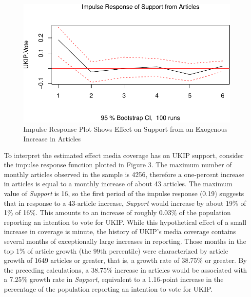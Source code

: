 \documentclass[12pt,]{article}
\makeatletter
\def\maxwidth{\ifdim\Gin@nat@width>\linewidth\linewidth
\else\Gin@nat@width\fi}
\let\Oldincludegraphics\includegraphics
\renewcommand{\includegraphics}[1]{\Oldincludegraphics[width=\maxwidth]{#1}}
\makeatother
\begin{document}
\begin{figure}[htbp]
\centering
\includegraphics{ukip_media_files/figure-latex/unnamed-chunk-8-1.pdf}
\caption{Impulse Response Plot Shows Effect on Support from an Exogenous
Increase in Articles}
\end{figure}

To interpret the estimated effect media coverage has on UKIP support,
consider the impulse response function plotted in Figure 3. The maximum
number of monthly articles observed in the sample is 4256, therefore a
one-percent increase in articles is equal to a monthly increase of about
43 articles. The maximum value of \emph{Support} is 16, so the first
period of the impulse response (0.19) suggests that in response to a
43-article increase, \emph{Support} would increase by about 19\% of 1\%
of 16\%. This amounts to an increase of roughly 0.03\% of the population
reporting an intention to vote for UKIP. While this hypothetical effect
of a small increase in coverage is minute, the history of UKIP's media
coverage contains several months of exceptionally large increases in
reporting. Those months in the top 1\% of article growth (the 99th
percentile) were characterized by article growth of 1649 articles or
greater, that is, a growth rate of 38.75\% or greater. By the preceding
calculations, a 38.75\% increase in articles would be associated with a
7.25\% growth rate in \emph{Support}, equivalent to a 1.16-point
increase in the percentage of the population reporting an intention to
vote for UKIP.
\end{document}
